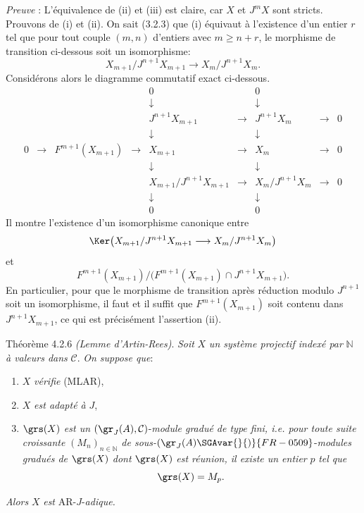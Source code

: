 \emph{Preuve} : L'équivalence de (ii) et (iii) est claire, car \(X\) et \(J^mX\) sont stricts. Prouvons  de (i) et (ii). On sait (3.2.3) que (i) équivaut à l'existence d'un entier \(r\) tel que pour tout couple \((m,n)\) d'entiers avec \(m\ge n+r\), le morphisme de transition ci-dessous soit un isomorphisme:
\[
X_{m+1}/J^{n+1}X_{m+1}\longrightarrow X_m/J^{n+1}X_m.
\]
Considérons alors le diagramme commutatif exact ci-dessous.
\[
\begin{array}{ccccccccccc}
&&&&0&&0\\
&&&&\downarrow&&\downarrow\\
&&&&J^{n+1}X_{m+1}&\longrightarrow&J^{n+1}X_m&\longrightarrow&0\\
&&&&\downarrow&&\downarrow\\
0&\longrightarrow&F^{m+1}(X_{m+1})&\longrightarrow&X_{m+1}&\longrightarrow&X_m&\longrightarrow&0\\
&&&&\downarrow&&\downarrow\\
&&&&X_{m+1}/J^{n+1}X_{m+1}&\longrightarrow&X_m/J^{n+1}X_m&\longrightarrow&0\\
&&&&\downarrow&&\downarrow\\
&&&&0&&0
\end{array}
\]
Il
montre l'existence d'un isomorphisme canonique entre
\[
\Ker\bigl(X_{m+1}/J^{n+1}X_{m+1}
       \longrightarrow X_m/J^{n+1}X_m\bigr)
\]
et
\[
F^{m+1}(X_{m+1})/
\bigl(F^{m+1}(X_{m+1})\cap J^{n+1}X_{m+1}\bigr).
\]
En particulier, pour que le morphisme de transition après réduction modulo \(J^{n+1}\) soit un isomorphisme, il faut et il suffit que \(F^{m+1}(X_{m+1})\) soit contenu dans \(J^{n+1}X_{m+1}\), ce qui est précisément l'assertion (ii).

\begin{statement}{Théorème 4.2.6}
\emph{(Lemme d'Artin-Rees)}. \emph{Soit} \(X\) \emph{un système projectif indexé par} \(\mathbb{N}\) \emph{à valeurs dans} \(\mathcal{C}\). \emph{On suppose que}:
\begin{enumerate}[label=\textup{(\roman*)}]
\item \(X\) \emph{vérifie} (MLAR),
\item \(X\) \emph{est adapté à} \(J\),
\item \(\grs(X)\) \emph{est un} \((\gr_J(A),\mathcal{C})\)-\emph{module gradué de type fini, i.e. pour toute suite croissante} \((M_n)_{n\in\mathbb{N}}\) \emph{de sous-}\((\gr_J(A)\SGAvar{}{)}{FR-0509}\)-\emph{modules gradués de} \(\grs(X)\) \emph{dont} \(\grs(X)\) \emph{est réunion, il existe un entier} \(p\) \emph{tel que}
\[
\grs(X)=M_p.
\]
\end{enumerate}
\emph{Alors} \(X\) \emph{est} AR-\(J\)-\emph{adique.}
\end{statement}

